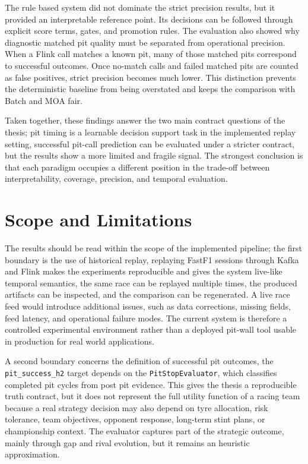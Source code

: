 \begin{enumerate}
          The rule based system did not dominate the strict precision results, but it provided an interpretable reference point. Its decisions can be followed through explicit
          score terms, gates, and promotion rules. The evaluation also showed why diagnostic matched pit quality must be separated from operational precision. When a Flink call
          matches a known pit, many of those matched pits correspond to successful outcomes. Once no-match calls and failed matched pits are counted as false positives, strict
          precision becomes much lower. This distinction prevents the deterministic baseline from being overstated and keeps the comparison with Batch and MOA fair.

\end{enumerate}

Taken together, these findings answer the two main contract questions of the thesis; pit timing is a learnable decision support task in the implemented replay setting,
successful pit-call prediction can be evaluated under a stricter contract, but the results show a more limited and fragile signal. The strongest conclusion is 
that each paradigm occupies a different position in the trade-off between interpretability, coverage, precision, and temporal evaluation.

\section{Scope and Limitations}

The results should be read within the scope of the implemented pipeline; the first boundary is the use of historical replay, replaying FastF1 sessions through Kafka and
Flink makes the experiments reproducible and gives the system live-like temporal semantics, the same race can be replayed multiple times, the produced artifacts can be
inspected, and the comparison can be regenerated. A live race feed would introduce additional issues, such as data corrections, missing fields, feed latency, and operational
failure modes. The current system is therefore a controlled experimental environment rather than a deployed pit-wall tool usable in production for real world applications.

A second boundary concerns the definition of successful pit outcomes, the \texttt{pit\_success\_h2} target depends on the \texttt{PitStopEvaluator}, which classifies completed
pit cycles from post pit evidence. This gives the thesis a reproducible truth contract, but it does not represent the full utility function of a racing team because a real strategy
decision may also depend on tyre allocation, risk tolerance, team objectives, opponent response, long-term stint plans, or championship context. The evaluator captures part of
the strategic outcome, mainly through gap and rival evolution, but it remains an heuristic approximation.

